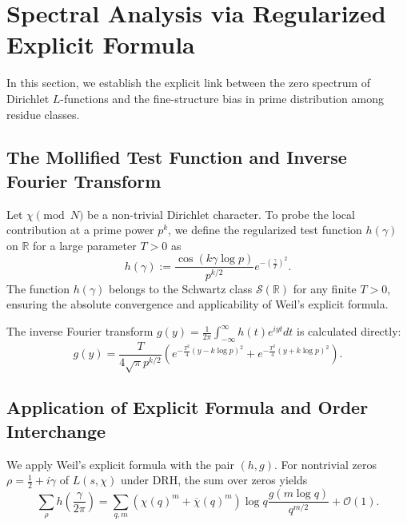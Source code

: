 \documentclass[12pt,reqno]{amsart}
\theoremstyle{definition}
\theoremstyle{remark}
\numberwithin{equation}{section}
\begin{document}
\section{Spectral Analysis via Regularized Explicit Formula}

In this section, we establish the explicit link between the zero spectrum of Dirichlet $L$-functions and the fine-structure bias in prime distribution among residue classes.

\subsection{The Mollified Test Function and Inverse Fourier Transform}

Let $\chi \pmod N$ be a non-trivial Dirichlet character. To probe the local contribution at a prime power $p^k$, we define the regularized test function $h(\gamma)$ on $\mathbb{R}$ for a large parameter $T > 0$ as
\begin{equation}
h(\gamma) := \frac{\cos(k \gamma \log p)}{p^{k/2}} e^{-\left(\frac{\gamma}{T}\right)^2}.
\end{equation}
The function $h(\gamma)$ belongs to the Schwartz class $\mathcal{S}(\mathbb{R})$ for any finite $T > 0$, ensuring the absolute convergence and applicability of Weil's explicit formula.

The inverse Fourier transform $g(y) = \frac{1}{2\pi} \int_{-\infty}^{\infty} h(t) e^{i y t} dt$ is calculated directly:
\begin{equation}
g(y) = \frac{T}{4\sqrt{\pi} p^{k/2}} \left( e^{-\frac{T^2}{4}(y - k \log p)^2} + e^{-\frac{T^2}{4}(y + k \log p)^2} \right).
\end{equation}

\subsection{Application of Explicit Formula and Order Interchange}

We apply Weil's explicit formula \cite[Theorem 5.12]{IK} with the pair $(h, g)$. For nontrivial zeros $\rho = \frac{1}{2} + i\gamma$ of $L(s, \chi)$ under DRH, the sum over zeros yields
\begin{equation}
\sum_{\rho} h\left(\frac{\gamma}{2\pi}\right) = \sum_{q, m} (\chi(q)^m + \overline{\chi}(q)^m) \log q \frac{g(m \log q)}{q^{m/2}} + \mathcal{O}(1).
\end{equation}
\end{document}
